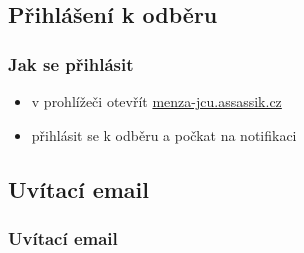 \documentclass[slidestop]{beamer}
\begin{document}
\subsection{Přihlášení k odběru}
\begin{frame}
\frametitle{Jak se přihlásit}
\begin{itemize}
\item v prohlížeči otevřít \href{https://menza-jcu.assassik.cz}{menza-jcu.assassik.cz} \pause
\begin{figure}[h] %
\begin{center}
\end{center}
\end{figure}
\item přihlásit se k odběru a počkat na notifikaci
\end{itemize}
\end{frame}
\subsection{Uvítací email}
\begin{frame}
\frametitle{Uvítací email}
\vfill
\begin{figure}[h] %
\begin{center}
\end{center}
\end{figure}
\vfill
\end{frame}
\end{document}
